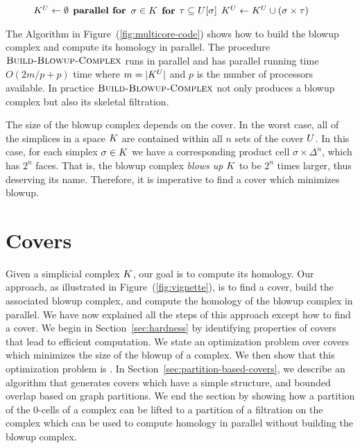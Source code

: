 \begin{figure}
\begin{codebox}
\li $K^{U} \gets \emptyset$
\li $\textbf{parallel for}$ $\sigma \in K$
\li \Do $\textbf{for}$ $\tau \subseteq U[\sigma]$
\li \Do $K^{U} \gets K^{U} \cup (\sigma \times \tau)$ 
\end{codebox}
\end{figure}
The Algorithm in Figure~(\ref{fig:multicore-code}) shows how to build the blowup complex and compute its homology in parallel. 
The procedure $\textnormal{\scshape Build-Blowup-Complex}$ runs in parallel and has parallel running time $O(2m/p + p)$ time where $m = |K^{U}|$ and $p$ is the number of processors available. In practice $\textnormal{\scshape Build-Blowup-Complex}$ not only produces a blowup complex but also its skeletal filtration.

The size of the blowup complex depends on the cover. In the worst case, all of 
the simplices in a space $K$ are contained within all $n$ sets of the cover 
$U$. In this case, for each simplex $\sigma \in K$ we have a corresponding 
product cell $\sigma \times \Delta^n$, which has $2^n$ faces. That is, the 
blowup complex \emph{blows up} $K$ to be $2^n$ times larger, thus deserving 
its name. Therefore, it is imperative to find a cover which minimizes blowup.

\section{Covers}
\label{sec:covers}
Given a simplicial complex $K$, our goal is to compute its homology.  
Our approach, as illustrated in Figure~(\ref{fig:vignette}), is to find a cover, 
build the associated blowup complex, and compute the homology of the blowup complex in 
parallel. We have now explained all the steps of this approach except how to find a cover. 
We begin in Section~\ref{sec:hardness} by identifying 
properties of covers that lead to efficient computation.
We state an optimization problem over covers which 
minimizes the size of the blowup of a complex. We then show that this optimization problem is \NPH{}.  
In Section~\ref{sec:partition-based-covers}, we describe an algorithm 
that generates covers which have a simple structure, and bounded overlap 
based on graph partitions. We end the section by showing how a partition of the 
0-cells of a complex can be lifted to a partition of a filtration on the complex 
which can be used to compute homology in parallel without building the blowup complex.
